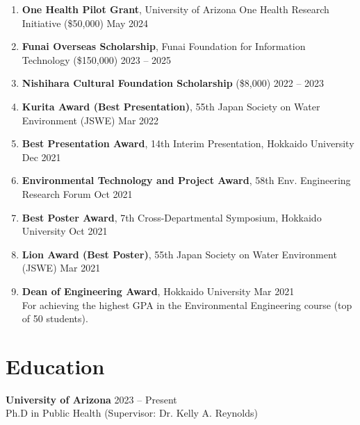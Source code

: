 \documentclass[11pt,a4paper]{article}
\begin{document}
\begin{enumerate}[label=\arabic*., series=awardcount, leftmargin=1.5em, itemsep=1pt, parsep=1pt]
    \small %
    \setcounter{enumi}{8} %
    
    \item \textbf{One Health Pilot Grant}, University of Arizona One Health Research Initiative (\$50,000) \hfill May 2024
    \addtocounter{enumi}{-2}
    
    \item \textbf{Funai Overseas Scholarship}, Funai Foundation for Information Technology (\$150,000) \hfill 2023 -- 2025
    \addtocounter{enumi}{-2}

    \item \textbf{Nishihara Cultural Foundation Scholarship} (\$8,000) \hfill 2022 -- 2023
    \addtocounter{enumi}{-2}

    \item \textbf{Kurita Award (Best Presentation)}, 55th Japan Society on Water Environment (JSWE) \hfill Mar 2022
    \addtocounter{enumi}{-2}

    \item \textbf{Best Presentation Award}, 14th Interim Presentation, Hokkaido University \hfill Dec 2021
    \addtocounter{enumi}{-2}

    \item \textbf{Environmental Technology and Project Award}, 58th Env. Engineering Research Forum \hfill Oct 2021
    \addtocounter{enumi}{-2}

    \item \textbf{Best Poster Award}, 7th Cross-Departmental Symposium, Hokkaido University \hfill Oct 2021
    \addtocounter{enumi}{-2}

    \item \textbf{Lion Award (Best Poster)}, 55th Japan Society on Water Environment (JSWE) \hfill Mar 2021
    \addtocounter{enumi}{-2}

    \item \textbf{Dean of Engineering Award}, Hokkaido University \hfill Mar 2021 \\
    {\footnotesize For achieving the highest GPA in the Environmental Engineering course (top of 50 students).}
\end{enumerate}

\section{Education}
\textbf{University of Arizona} \hfill 2023 -- Present \\
Ph.D in Public Health (Supervisor: Dr. Kelly A. Reynolds)
\end{document}
